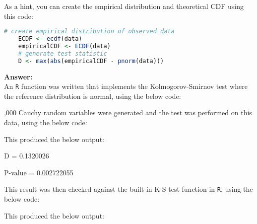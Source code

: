 \documentclass[12pt,letterpaper]{article}
\begin{document}
	
\noindent As a hint, you can create the empirical distribution and theoretical CDF using this code:

\begin{lstlisting}[language=R]
	# create empirical distribution of observed data
	ECDF <- ecdf(data)
	empiricalCDF <- ECDF(data)
	# generate test statistic
	D <- max(abs(empiricalCDF - pnorm(data))) \end{lstlisting}

\vspace{.5cm}
\noindent
\textbf{Answer:}\\

An \texttt{R} function was written that implements the Kolmogorov-Smirnov test where the reference distribution is normal, using the below code:

\vspace{.5cm}

  

\vspace{.5cm} 

,000 Cauchy random variables were generated and the test was performed on this data, using the below code:

\vspace{.5cm}

  
  

\vspace{.5cm} 

\noindent This produced the below output:

\vspace{.5cm} 

D = 0.1320026

P-value = 0.002722055 

\vspace{.5cm}

\noindent This result was then checked against the built-in K-S test function in \texttt{R}, using the below code:

\vspace{.5cm}

  

\vspace{.5cm}

\noindent This produced the below output:

\vspace{.5cm}
\end{document}
